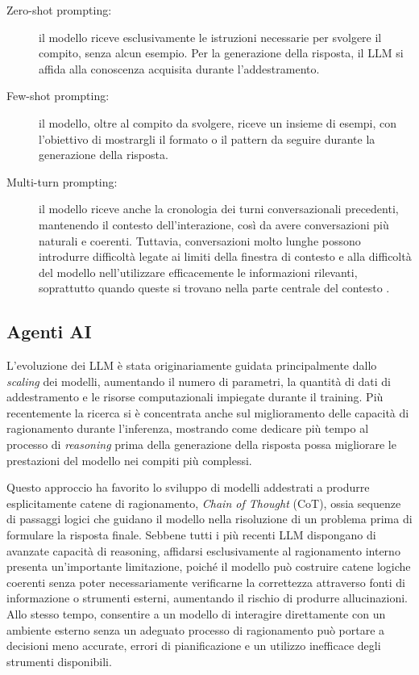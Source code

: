 \begin{description}
    \item[Zero-shot prompting:] il modello riceve esclusivamente le istruzioni necessarie per svolgere il compito, senza alcun esempio. Per la generazione della risposta, il LLM si affida alla conoscenza acquisita durante l'addestramento.
    \item[Few-shot prompting:] il modello, oltre al compito da svolgere, riceve un insieme di esempi, con l'obiettivo di mostrargli il formato o il pattern da seguire durante la generazione della risposta.
    \item[Multi-turn prompting:] il modello riceve anche la cronologia dei turni conversazionali precedenti, mantenendo il contesto dell'interazione, così da avere conversazioni più naturali e coerenti. Tuttavia, conversazioni molto lunghe possono introdurre difficoltà legate ai limiti della finestra di contesto e alla difficoltà del modello nell'utilizzare efficacemente le informazioni rilevanti, soprattutto quando queste si trovano nella parte centrale del contesto \cite{liu2024lost}.
\end{description}

\subsection{Agenti AI} %

L'evoluzione dei LLM è stata originariamente guidata principalmente dallo \emph{scaling} dei modelli, aumentando il numero di parametri, la quantità di dati di addestramento e le risorse computazionali impiegate durante il training. Più recentemente la ricerca si è concentrata anche sul miglioramento delle capacità di ragionamento durante l'inferenza, mostrando come dedicare più tempo al processo di \emph{reasoning} prima della generazione della risposta possa migliorare le prestazioni del modello nei compiti più complessi.

Questo approccio ha favorito lo sviluppo di modelli addestrati a produrre esplicitamente catene di ragionamento, \emph{Chain of Thought} (CoT), ossia sequenze di passaggi logici che guidano il modello nella risoluzione di un problema prima di formulare la risposta finale. Sebbene tutti i più recenti LLM dispongano di avanzate capacità di reasoning, affidarsi esclusivamente al ragionamento interno presenta un'importante limitazione, poiché il modello può costruire catene logiche coerenti senza poter necessariamente verificarne la correttezza attraverso fonti di informazione o strumenti esterni, aumentando il rischio di produrre allucinazioni. Allo stesso tempo, consentire a un modello di interagire direttamente con un ambiente esterno senza un adeguato processo di ragionamento può portare a decisioni meno accurate, errori di pianificazione e un utilizzo inefficace degli strumenti disponibili.

